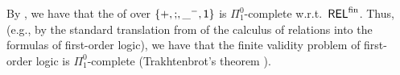 By , we have that the  of  over $\{\mathbin{+}, \mathbin{;}, \_^{-}, \mathsf{1}\}$ is $\Pi^{0}_{1}$-complete w.r.t.\ $\mathsf{REL}^{\mathrm{fin}}$.
Thus, (e.g.,  by the standard translation \cite{tarskiCalculusRelations1941} from  of the calculus of relations into the formulas of first-order logic),
we have that the finite validity problem of first-order logic is $\Pi^{0}_{1}$-complete (Trakhtenbrot's theorem \cite{trakhtenbrotImpossibilityAlgorithmDecision1950}).

